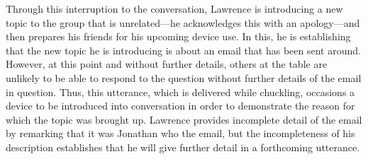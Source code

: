 \begin{revisedsubmission}
Through this interruption to the conversation, Lawrence is introducing a new topic to the group that is unrelated---he acknowledges this with an apology---and then prepares his friends for his upcoming device use.
In this, he is establishing that the new topic he is introducing is about an email that has been sent around.
However, at this point and without further details, others at the table are unlikely to be able to respond to the question without further details of the email in question.
Thus, this utterance, which is delivered while chuckling, occasions a device to be introduced into conversation in order to demonstrate the reason for which the topic was brought up.
Lawrence provides incomplete detail of the email by remarking that it was Jonathan who  the email, but the incompleteness of his description establishes that he will give further detail in a forthcoming utterance.
\end{revisedsubmission}






